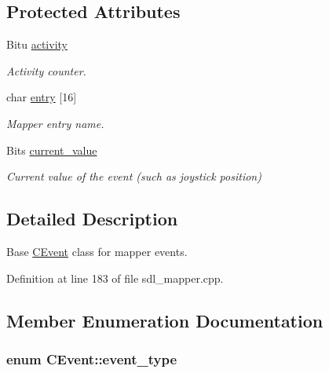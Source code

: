 \subsection*{Protected Attributes}
\begin{DoxyCompactItemize}
\item 
\hypertarget{classCEvent_a487786e4e537594bf963e96aecae85cd}{Bitu \hyperlink{classCEvent_a487786e4e537594bf963e96aecae85cd}{activity}}\label{classCEvent_a487786e4e537594bf963e96aecae85cd}

\begin{DoxyCompactList}\small\item\em Activity counter. \end{DoxyCompactList}\item 
\hypertarget{classCEvent_a20cca21cb3c606f3161a2757c1ba466d}{char \hyperlink{classCEvent_a20cca21cb3c606f3161a2757c1ba466d}{entry} \mbox{[}16\mbox{]}}\label{classCEvent_a20cca21cb3c606f3161a2757c1ba466d}

\begin{DoxyCompactList}\small\item\em Mapper entry name. \end{DoxyCompactList}\item 
\hypertarget{classCEvent_a7bbacdb8e3c5ee41ce13af19dc21db2d}{Bits \hyperlink{classCEvent_a7bbacdb8e3c5ee41ce13af19dc21db2d}{current\-\_\-value}}\label{classCEvent_a7bbacdb8e3c5ee41ce13af19dc21db2d}

\begin{DoxyCompactList}\small\item\em Current value of the event (such as joystick position) \end{DoxyCompactList}\end{DoxyCompactItemize}


\subsection{Detailed Description}
Base \hyperlink{classCEvent}{C\-Event} class for mapper events. 

Definition at line 183 of file sdl\-\_\-mapper.\-cpp.



\subsection{Member Enumeration Documentation}
\hypertarget{classCEvent_a93a65775636793dfcabe38d14739c2bd}{
\subsubsection[{event\-\_\-type}]{\setlength{\rightskip}{0pt plus 5cm}enum {\bf C\-Event\-::event\-\_\-type}}}\label{classCEvent_a93a65775636793dfcabe38d14739c2bd}


